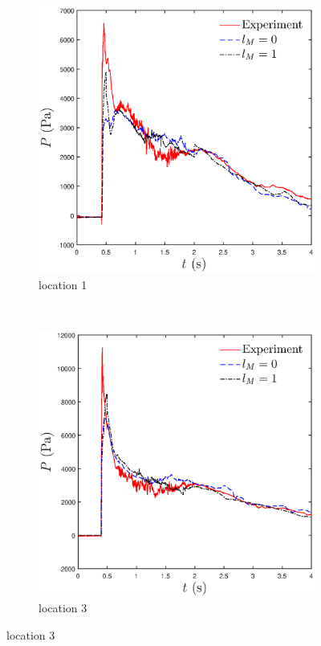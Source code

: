 \documentclass[11pt,a4paper,twoside]{article}
\begin{document}
	\begin{figure}[ht!]
		\begin{center}
			\begin{subfigure}[]{0.45\textwidth}
				\includegraphics[width=\textwidth]{Pr3D_lm_1.eps}
				\caption{location 1}
			\end{subfigure}	
			~
			\begin{subfigure}[]{0.45\textwidth}
				\includegraphics[width=\textwidth]{Pr3D_lm_3.eps}
				\caption{location 3}
			\end{subfigure}		
			

\end{center}
\end{figure}
\end{document}

